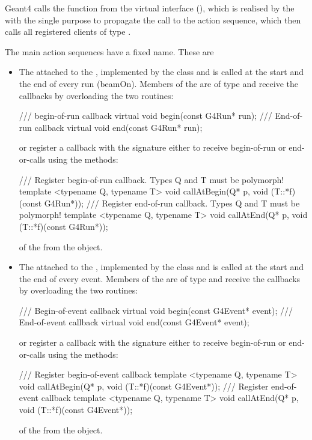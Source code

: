 \documentclass[10pt,a4paper]{article}
\begin{document}
\noindent
Geant4 calls the function from the virtual interface (), 
which is realised by the  with the single purpose to
propagate the call to the action sequence, which then calls all registered clients
of type .

\noindent
The main action sequences have a fixed name. These are
\begin{itemize}

\item The  attached to the , implemented 
    by the  class and is called at the start and the end of 
    every run (beamOn). Members of the  are of type
     and receive the callbacks by overloading the two routines:
\begin{unnumberedcode}
/// begin-of-run callback
virtual void begin(const G4Run* run);
/// End-of-run callback
virtual void end(const G4Run* run);
\end{unnumberedcode}
    or register a callback with the signature {}
    either to receive begin-of-run or end-or-calls using the methods:
\begin{unnumberedcode}
/// Register begin-of-run callback. Types Q and T must be polymorph!
template <typename Q, typename T> void callAtBegin(Q* p, void (T::*f)(const G4Run*));
/// Register end-of-run callback. Types Q and T must be polymorph!
template <typename Q, typename T> void callAtEnd(Q* p, void (T::*f)(const G4Run*));
\end{unnumberedcode}
    of the  from the  object.


\item The  attached to the , implemented 
    by the  class and is called at the start and the end of 
    every event. Members of the  are of type
     and receive the callbacks by overloading the two routines:
\begin{unnumberedcode}
/// Begin-of-event callback
virtual void begin(const G4Event* event);
/// End-of-event callback
virtual void end(const G4Event* event);
\end{unnumberedcode}
    or register a callback with the signature {}
    either to receive begin-of-run or end-or-calls using the methods:
\begin{unnumberedcode}
/// Register begin-of-event callback
template <typename Q, typename T> void callAtBegin(Q* p, void (T::*f)(const G4Event*));
/// Register end-of-event callback
template <typename Q, typename T> void callAtEnd(Q* p, void (T::*f)(const G4Event*));
\end{unnumberedcode}
    of the  from the  object.



\end{itemize}
\end{document}
